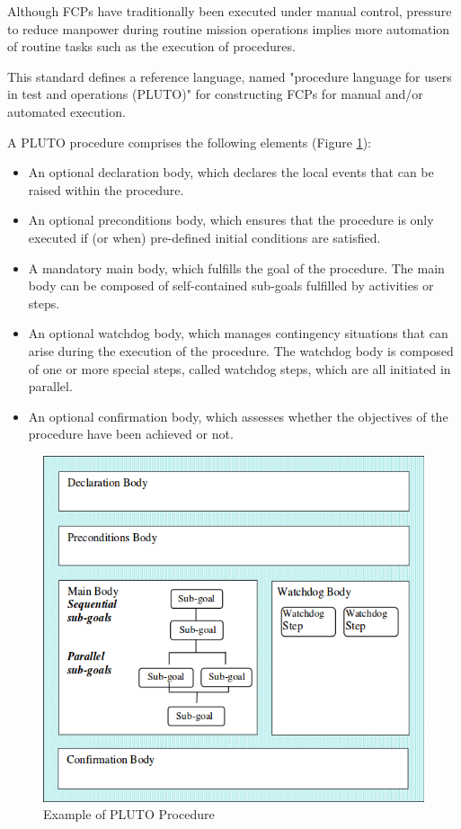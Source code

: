 Although FCPs have traditionally been executed under manual control, pressure to reduce manpower during routine mission operations implies more automation of routine tasks such as the execution of procedures.

This standard defines a reference language, named "procedure language for users in test and operations (PLUTO)" for constructing FCPs for manual and/or automated execution.

A PLUTO procedure comprises the following elements (Figure \ref{fig:Example of PLUTO Procedure}):

\begin{itemize}
\item An optional declaration body, which declares the local events that can be raised within the procedure. 
\item An optional preconditions body, which ensures that the procedure is only executed if (or when) pre-defined initial conditions are satisfied.
\item A mandatory main body, which fulfills the goal of the procedure. The main body can be composed of self-contained sub-goals fulfilled by activities or steps.
\item An optional watchdog body, which manages contingency situations that can arise during the execution of the procedure. The watchdog body is composed of one or more special steps, called watchdog steps, which are all initiated in parallel.
\item An optional confirmation body, which assesses whether the objectives of the procedure have been achieved or not. 
\end{itemize}

 \begin{figure}[h]
\centering\includegraphics[scale=0.45]{fig/example_of_pluto_procedure}
\caption{Example of PLUTO Procedure}
\label{fig:Example of PLUTO Procedure}
\end{figure}

